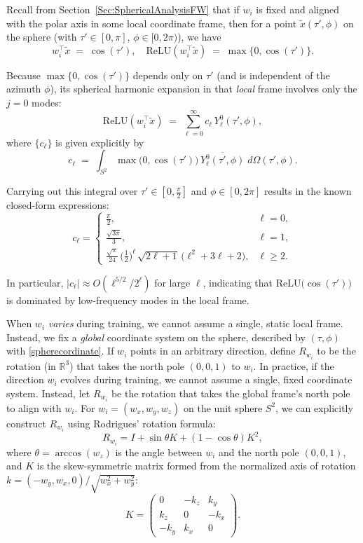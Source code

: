 \documentclass[review,onefignum,onetabnum,onealgnum]{siamart250106}
\numberwithin{theorem}{section}
\begin{document}
Recall from Section~\ref{Sec:SphericalAnalysisFW} that if \(w_i\) is fixed and aligned with the polar axis in 
some local coordinate frame, then for a point \(\tilde{x}(\tau',\phi)\) on the sphere (with 
\(\tau'\in[0,\pi]\), \(\phi\in[0,2\pi)\)), we have
\[
w_i^\top \tilde{x}
\;=\;
\cos(\tau'),
\quad
\mathrm{ReLU}(w_i^\top \tilde{x})
\;=\;
\max\{0,\cos(\tau')\}.
\]

Because \(\max\{0,\cos(\tau')\}\) depends only on \(\tau'\) (and is independent of the azimuth \(\phi\)), 
its spherical harmonic expansion in that \emph{local} frame involves only the \(j=0\) modes:
\[
\mathrm{ReLU}(w_i^\top \tilde{x})
\;=\;
\sum_{\ell=0}^{\infty}
c_{\ell}\,
Y_\ell^0(\tau',\phi),
\]
where \(\bigl\{c_{\ell}\bigr\}\) is given explicitly by
\[
c_{\ell}
\;=\;
\int_{S^2}
\max\!\bigl(0,\cos(\tau')\bigr)
\,\overline{Y_\ell^0(\tau',\phi)}
\;d\Omega(\tau',\phi).
\]

Carrying out this integral over \(\tau'\in[0,\tfrac{\pi}{2}]\) and \(\phi\in[0,2\pi]\) 
results in the known closed-form expressions:
\[
c_{\ell}
=
\begin{cases}
\displaystyle
\frac{\pi}{2}, & \ell=0,\\[0.75em]
\displaystyle
\frac{\sqrt{3\pi}}{3}, & \ell=1,\\[0.75em]
\displaystyle
\frac{\sqrt{\pi}}{24}\,\bigl(\tfrac12\bigr)^\ell\,\sqrt{2\ell+1}\,\bigl(\ell^2 + 3\ell +2\bigr),
& \ell\ge2.
\end{cases}
\]

In particular, \(\bigl|c_{\ell}\bigr|\approx O(\ell^{5/2}/2^\ell)\) for large \(\ell\), indicating that 
\(\mathrm{ReLU}\bigl(\cos(\tau')\bigr)\) is dominated by low-frequency modes in the local frame.


When \(w_i\) \emph{varies} during training, we cannot assume a single, static local frame.  Instead, we fix a 
\emph{global} coordinate system on the sphere, described by \((\tau,\phi)\) with \eqref{spherecordinate}. If $w_i$ points in an arbitrary direction, define $R_{w_i}$ to be the rotation (in $\mathbb{R}^3$) that 
takes the north pole $(0,0,1)$ to $w_i$.  In practice, if the direction \( w_i \) evolves during training, we cannot assume a single, fixed coordinate system. Instead, let \(R_{w_i}\) be the rotation that takes the global frame's north pole to align with \(w_i\). For \(w_i = (w_x, w_y, w_z)\) on the unit sphere \(S^2\), we can explicitly construct \(R_{w_i}\) using Rodrigues' rotation formula:
\[
R_{w_i} = I + \sin\theta K + (1-\cos\theta)K^2,
\]
where \(\theta = \arccos(w_z)\) is the angle between \(w_i\) and the north pole \((0,0,1)\), and \(K\) is the skew-symmetric matrix formed from the normalized axis of rotation \(k = (-w_y, w_x, 0)/\sqrt{w_x^2 + w_y^2}\):
\[
K = \begin{pmatrix} 
0 & -k_z & k_y \\
k_z & 0 & -k_x \\
-k_y & k_x & 0
\end{pmatrix}.
\]
\end{document}
